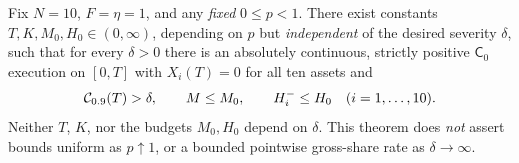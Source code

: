 \documentclass[review,hidelinks,onefignum,onetabnum]{siamonline250211}%
\begin{document}
\begin{theorem}
\label{thm:nine-general}
Fix $N=10$, $F=\eta=1$, and any \emph{fixed}
$0\le p<1$. There exist constants $T,K,M_0,H_0\in(0,\infty)$,
depending on $p$ but \emph{independent} of the desired severity
$\delta$, such that for every $\delta>0$ there is an
absolutely continuous, strictly positive $\mathsf C_0$ execution
on $[0,T]$ with $X_i(T)=0$ for all ten assets and
\begin{equation}\label{eq:general-severity}
 \mathcal{C}_{0.9}(T)>\delta,\qquad M\le M_0,\qquad
 H_i^-\le H_0\quad(i=1,\ldots,10).
\end{equation}
Neither $T$, $K$, nor the budgets $M_0,H_0$ depend on
$\delta$. This theorem does \emph{not} assert bounds uniform
as $p\uparrow1$, or a bounded pointwise gross-share rate as
$\delta\to\infty$.
\end{theorem}
\end{document}
